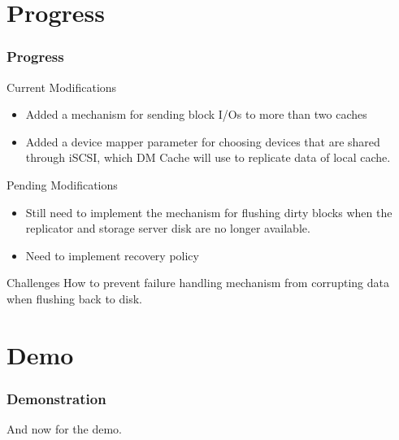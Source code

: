 \section{Progress}
%
\begin{frame}
    \frametitle{Progress}
    \begin{block}{Current Modifications}
	\begin{itemize}
	    \item Added a mechanism for sending block I/Os to more
		than two caches
	    \item Added a device mapper parameter for choosing devices that
		are shared through iSCSI, which DM Cache will use to replicate
		data of local cache.
	\end{itemize}
    \end{block}
    \begin{block}{Pending Modifications}
    	\begin{itemize}
		\item Still need to implement the mechanism for flushing
		dirty blocks when the replicator and storage server disk are no longer available.
		\item Need to implement recovery policy
    	\end{itemize}
    \end{block}
    \begin{block}{Challenges}
	How to prevent failure handling mechanism from corrupting data when flushing back to disk.
    \end{block}
\end{frame}
\section{Demo}
\begin{frame}
    \frametitle{Demonstration}
    \begin{center}And now for the demo.\end{center}
\end{frame}


